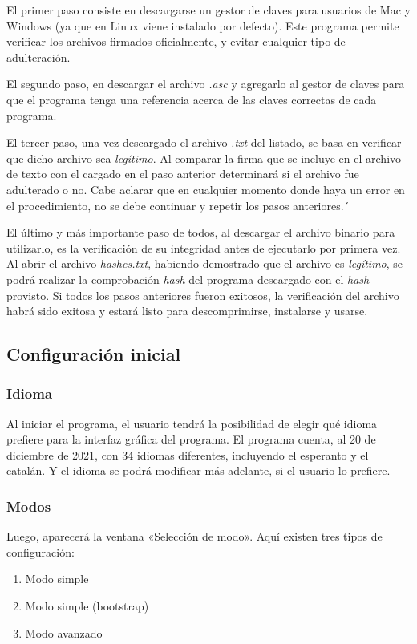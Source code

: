 \documentclass[12pt,a4paper,twoside]{book}
\begin{document}
El primer paso consiste en descargarse un gestor de claves para usuarios de Mac y Windows (ya que en Linux viene instalado por defecto). Este programa permite verificar los archivos firmados oficialmente, y evitar cualquier tipo de adulteración.

El segundo paso, en descargar el archivo \textit{.asc} y agregarlo al gestor de claves para que el programa tenga una referencia acerca de las claves correctas de cada programa.

El tercer paso, una vez descargado el archivo \textit{.txt} del listado, se basa en verificar que dicho archivo sea \textit{legítimo}. Al comparar la firma que se incluye en el archivo de texto con el cargado en el paso anterior determinará si el archivo fue adulterado o no. Cabe aclarar que en cualquier momento donde haya un error en el procedimiento, no se debe continuar y repetir los pasos anteriores.´

El último y más importante paso de todos, al descargar el archivo binario para utilizarlo, es la verificación de su integridad antes de ejecutarlo por primera vez. Al abrir el archivo \textit{hashes.txt}, habiendo demostrado que el archivo es \textit{legítimo}, se podrá realizar la comprobación \textit{hash} del programa descargado con el \textit{hash} provisto. Si todos los pasos anteriores fueron exitosos, la verificación del archivo habrá sido exitosa y estará listo para descomprimirse, instalarse y usarse.

\subsection{Configuración inicial}
\subsubsection{Idioma}
Al iniciar el programa, el usuario tendrá la posibilidad de elegir qué idioma prefiere para la interfaz gráfica del programa. El programa cuenta, al 20 de diciembre de 2021, con 34 idiomas diferentes, incluyendo el esperanto y el catalán. Y el idioma se podrá modificar más adelante, si el usuario lo prefiere.

\subsubsection{Modos}
Luego, aparecerá la ventana «Selección de modo». Aquí existen tres tipos de configuración:

\begin{enumerate}
\item Modo simple
\item Modo simple (bootstrap)
\item Modo avanzado
\end{enumerate}
\end{document}
